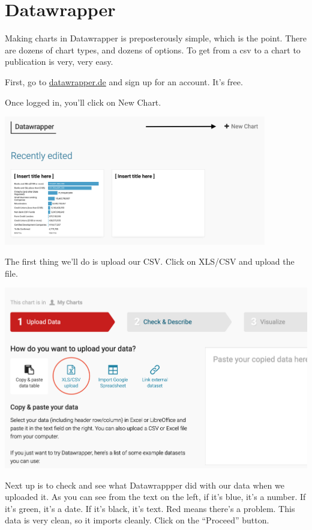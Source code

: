 \documentclass[
  letterpaper,
  DIV=11,
  numbers=noendperiod]{scrreprt}
\begin{document}
\hypertarget{datawrapper}{%
\section{Datawrapper}\label{datawrapper}}

Making charts in Datawrapper is preposterously simple, which is the
point. There are dozens of chart types, and dozens of options. To get
from a csv to a chart to publication is very, very easy.

First, go to \href{https://www.datawrapper.de/}{datawrapper.de} and sign
up for an account. It's free.

Once logged in, you'll click on New Chart.

\includegraphics[width=4.51in,height=\textheight]{./images/datawrapper1.png}

The first thing we'll do is upload our CSV. Click on XLS/CSV and upload
the file.

\includegraphics[width=6.75in,height=\textheight]{./images/datawrapper2.png}

Next up is to check and see what Datawrappper did with our data when we
uploaded it. As you can see from the text on the left, if it's blue,
it's a number. If it's green, it's a date. If it's black, it's text. Red
means there's a problem. This data is very clean, so it imports cleanly.
Click on the ``Proceed'' button.
\end{document}
